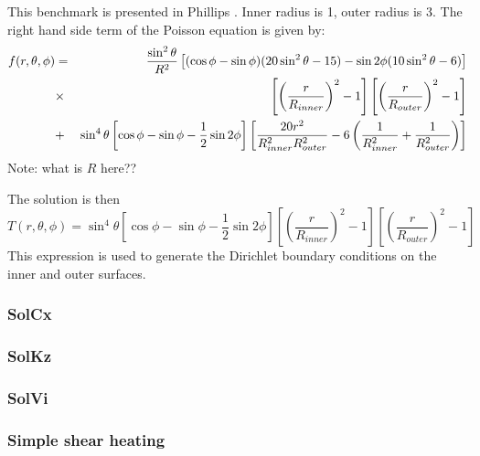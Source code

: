 This benchmark is presented in Phillips \etal \cite{phdo19}. 
Inner radius is 1, outer radius is 3.
The right hand side term of the Poisson equation is given by:
\begin{eqnarray}
f(r,\theta,\phi)&=&
\frac{\sin^2\theta }{R^2} 
\left[
(\cos\phi-\sin\phi)(20\sin^2\theta -15) -\sin 2\phi (10\sin^2 \theta -6)
\right] \nonumber\\
&\times & \left[ \left(\frac{r}{R_{inner}}\right)^2 -1  \right]
\left[ \left(\frac{r}{R_{outer}}\right)^2 -1  \right] \nonumber\\
&+&\sin^4 \theta
\left[ \cos\phi -\sin\phi -\frac12 \sin 2\phi \right]
\left[
\frac{20r^2}{R_{inner}^2R_{outer}^2} -6 \left( \frac{1}{R_{inner}^2}+\frac{1}{R_{outer}^2}  \right)
\right]
\end{eqnarray}
Note: what is $R$ here??

The solution is then 
\[
T(r,\theta,\phi) = \sin^4 \theta \left[ \cos\phi -\sin\phi -\frac12 \sin 2\phi \right]
\left[ \left(\frac{r}{R_{inner}}\right)^2 -1  \right]
\left[ \left(\frac{r}{R_{outer}}\right)^2 -1  \right]
\]
This expression is used to generate the Dirichlet boundary conditions on the inner and outer surfaces.


\subsubsection{SolCx}\label{ss:solcx} 


\subsubsection{SolKz} \label{ss:solkz} 


\subsubsection{SolVi} \label{ss:solvi} 



\subsubsection{Simple shear heating} \label{ss:shearheating} 












